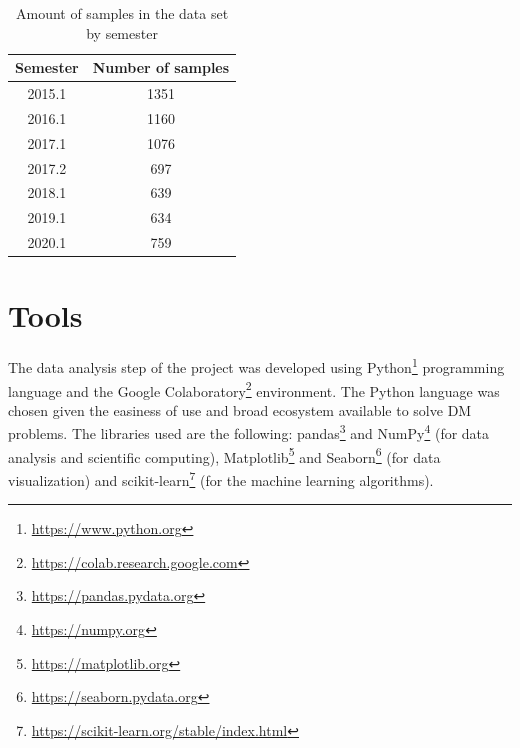 \begin{table}[htb]
\centering
\begin{tabular}{cc} \hline
\textbf{Semester} & \textbf{Number of samples} \\ \hline
2015.1 & 1351 \\
2016.1 & 1160 \\
2017.1 & 1076 \\
2017.2 & 697 \\
2018.1 & 639 \\
2019.1 & 634 \\
2020.1 & 759 \\ \hline
\end{tabular}
\caption{Amount of samples in the data set by semester}
\label{tab:sbys}
\end{table}

\section{Tools}

The data analysis step of the project was developed using Python\footnote[1]{\hspace{1mm}\url{https://www.python.org}} programming language and the Google Colaboratory\footnote[2]{\hspace{1mm}\url{https://colab.research.google.com}} environment. The Python language was chosen given the easiness of use and broad ecosystem available to solve DM problems. The libraries used are the following: pandas\footnote[3]{\hspace{1mm}\url{https://pandas.pydata.org}} and NumPy\footnote[4]{\hspace{1mm}\url{https://numpy.org}} (for data analysis and scientific computing), Matplotlib\footnote[5]{\hspace{1mm}\url{https://matplotlib.org}} and Seaborn\footnote[6]{\hspace{1mm}\url{https://seaborn.pydata.org}} (for data visualization) and scikit-learn\footnote[7]{\hspace{1mm}\url{https://scikit-learn.org/stable/index.html}} (for the machine learning algorithms).

